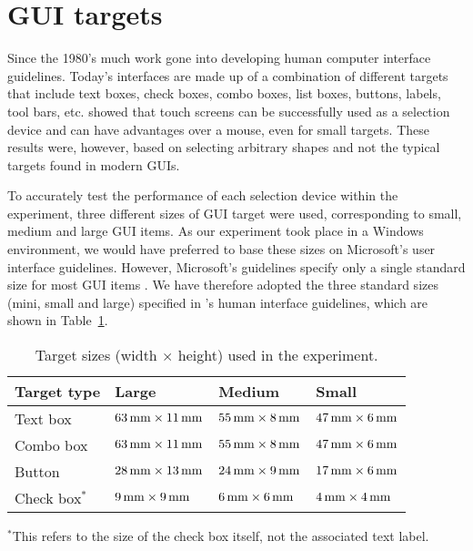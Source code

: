 \documentclass{elsart}
\begin{document}
\section{GUI targets}
\label{sec-GUI}

Since the 1980's much work gone into developing human computer interface
guidelines. Today's interfaces are made up of a combination of different
targets that include text boxes, check boxes, combo boxes, list boxes,
buttons, labels, tool bars, etc. \citet{Sear-A-1991-IJMMS} showed that
touch screens can be successfully used as a selection device and can
have advantages over a mouse, even for small targets. These results
were, however, based on selecting arbitrary shapes and not the typical
targets found in modern GUIs.

To accurately test the performance of each selection device within the
experiment, three different sizes of GUI target were used, corresponding
to small, medium and large GUI items. As our experiment took place in a
Windows environment, we would have preferred to base these sizes on
Microsoft's user interface guidelines. However, Microsoft's guidelines
specify only a single standard size for most GUI items \citep[pp.\
448--450]{MS-1999-UI}. We have therefore adopted the three standard
sizes (mini, small and large) specified in \citeauthor{Appl-2004-HIG}'s
\citeyearpar{Appl-2004-HIG} human interface guidelines, which are shown
in Table~\ref{tab-target-sizes}.


\begin{table}
	\caption{Target sizes (width \(\times\) height) used in the experiment.}
	\label{tab-target-sizes}
	\begin{tabular}{llll}
		\hline
		\textbf{Target type}	&	\textbf{Large}							&	\textbf{Medium}							&	\textbf{Small}	\\
		\hline
		Text box				&	\(\unit[63]{mm} \times \unit[11]{mm}\)	&	\(\unit[55]{mm} \times \unit[8]{mm}\)	&	\(\unit[47]{mm} \times \unit[6]{mm}\)	\\
		Combo box				&	\(\unit[63]{mm} \times \unit[11]{mm}\)	&	\(\unit[55]{mm} \times \unit[8]{mm}\)	&	\(\unit[47]{mm} \times \unit[6]{mm}\)	\\
		Button					&	\(\unit[28]{mm} \times \unit[13]{mm}\)	&	\(\unit[24]{mm} \times \unit[9]{mm}\)	&	\(\unit[17]{mm} \times \unit[6]{mm}\)	\\
		Check box\(^{*}\)		&	\(\unit[9]{mm} \times \unit[9]{mm}\)	&	\(\unit[6]{mm} \times \unit[6]{mm}\)	&	\(\unit[4]{mm} \times \unit[4]{mm}\)	\\
		\hline
	\end{tabular}
	
	{\footnotesize \(^{*}\)This refers to the size of the check box itself, not the associated text label.}
\end{table}
\end{document}
